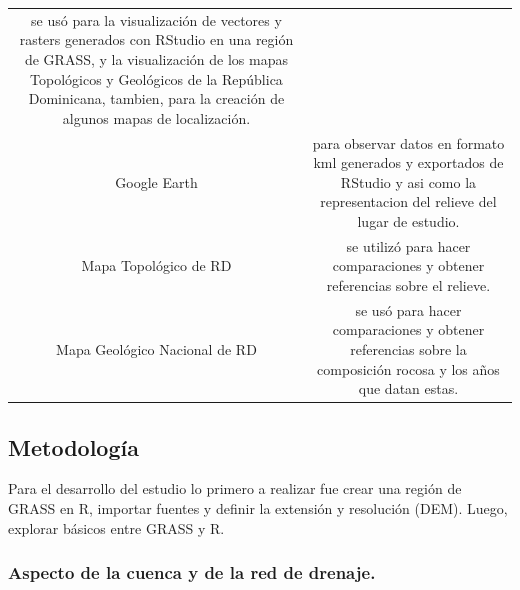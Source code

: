 \documentclass[11pt,]{article}
\begin{document}
\begin{longtable}[]{@{}cc@{}}
\begin{minipage}[t]{0.83\columnwidth}
se usó para la visualización de vectores y rasters generados con RStudio
en una región de GRASS, y la visualización de los mapas Topológicos y
Geológicos de la República Dominicana, tambien, para la creación de
algunos mapas de localización.\strut
\end{minipage}\tabularnewline
\begin{minipage}[t]{0.11\columnwidth}\centering\strut
Google Earth\strut
\end{minipage} & \begin{minipage}[t]{0.83\columnwidth}\centering\strut
para observar datos en formato kml generados y exportados de RStudio y
asi como la representacion del relieve del lugar de estudio.\strut
\end{minipage}\tabularnewline
\begin{minipage}[t]{0.11\columnwidth}\centering\strut
Mapa Topológico de RD\strut
\end{minipage} & \begin{minipage}[t]{0.83\columnwidth}\centering\strut
se utilizó para hacer comparaciones y obtener referencias sobre el
relieve.\strut
\end{minipage}\tabularnewline
\begin{minipage}[t]{0.11\columnwidth}\centering\strut
Mapa Geológico Nacional de RD\strut
\end{minipage} & \begin{minipage}[t]{0.83\columnwidth}\centering\strut
se usó para hacer comparaciones y obtener referencias sobre la
composición rocosa y los años que datan estas.\strut
\end{minipage}\tabularnewline
\bottomrule
\end{longtable}

\subsection{Metodología}\label{metodologuxeda}

Para el desarrollo del estudio lo primero a realizar fue crear una
región de GRASS en R, importar fuentes y definir la extensión y
resolución (DEM). Luego, explorar básicos entre GRASS y R.

\subsubsection{Aspecto de la cuenca y de la red de
drenaje.}\label{aspecto-de-la-cuenca-y-de-la-red-de-drenaje.}
\end{document}
